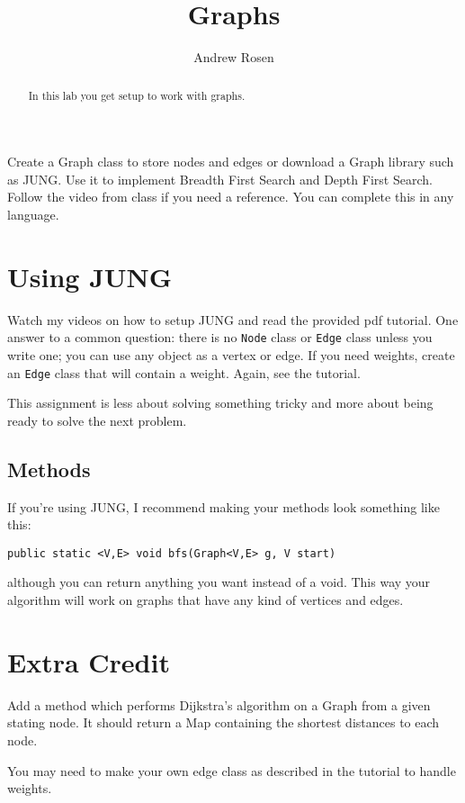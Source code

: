 \documentclass[10pt,letterpaper]{article}
\author{Andrew Rosen}
\title{Graphs}
\date{}
\begin{document}
	
	\maketitle
	
	\begin{abstract}
		In this lab you get setup to work with graphs.
	\end{abstract}


	Create a Graph class to store nodes and edges or download a Graph library such as JUNG. Use it to implement Breadth First Search and Depth First Search.
 	Follow the video from class if you need a reference.
 	You can complete this in any language.
 	\section{Using JUNG}
 	Watch my videos on how to setup JUNG and read the provided pdf tutorial.
 	One answer to a common question:  there is no \texttt{Node} class or \texttt{Edge} class unless you write one;  you can use any object as a vertex or edge.
 	If you need weights, create an \texttt{Edge} class that will contain a weight.  Again, see the tutorial.
 	
 	
 	This assignment is less about solving something tricky and more about being ready to solve the next problem.
 	
 	\subsection{Methods}
 	If you're using JUNG, I recommend making your methods look something like this:
 	
\begin{lstlisting}
public static <V,E> void bfs(Graph<V,E> g, V start)
\end{lstlisting}
 	
 	although you can return anything you want instead of a void.
This way your algorithm will work on graphs that have any kind of vertices and edges. 	
 	
 	
 	\section{Extra Credit}
 	
 	Add a method which performs Dijkstra's algorithm on a Graph from a given stating node.  It should return a Map containing the shortest distances to each node.
 	
 	You may need to make your own edge class as described in the tutorial to handle weights.
 	
\end{document}

